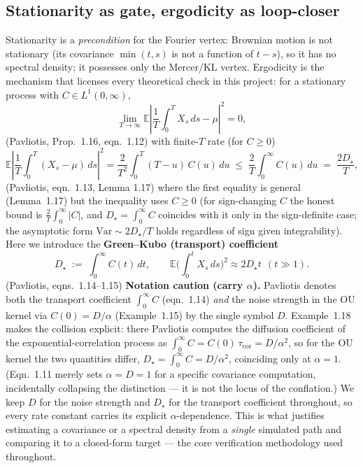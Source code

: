 \documentclass[11pt]{article}
\newcommand{\pav}[1]{{\small\color{hubblue}(Pavliotis, #1)}}
\newcommand{\Dstar}{D_{\star}}
\begin{document}
\subsection{Stationarity as gate, ergodicity as loop-closer}

Stationarity is a \emph{precondition} for the Fourier vertex: Brownian motion is not stationary (its
covariance $\min(t,s)$ is not a function of $t-s$), so it has no spectral density; it possesses only
the Mercer/KL vertex. Ergodicity is the mechanism that licenses every theoretical check in this
project: for a stationary process with $C\in L^1(0,\infty)$,
\begin{equation}
\lim_{T\to\infty}\mathbb{E}\left|\frac{1}{T}\int_0^T X_s\,ds - \mu\right|^2 = 0,
\label{eq:ergodic}
\end{equation}
\pav{Prop.~1.16, eqn.~1.12} with finite-$T$ rate (for $C\geq 0$)
\begin{equation}
\mathbb{E}\left|\frac{1}{T}\int_0^T (X_s-\mu)\,ds\right|^2 = \frac{2}{T^2}\int_0^T (T-u)\,C(u)\,du
\;\leq\; \frac{2}{T}\int_0^\infty C(u)\,du \;=\; \frac{2\Dstar}{T},
\label{eq:ergodic-rate}
\end{equation}
\pav{eqn.~1.13, Lemma 1.17} where the first equality is general (Lemma~1.17) but the inequality uses
$C\geq0$ (for sign-changing $C$ the honest bound is $\tfrac{2}{T}\int_0^\infty|C|$, and
$\Dstar=\int_0^\infty C$ coincides with it only in the sign-definite case; the asymptotic form
$\mathrm{Var}\sim 2\Dstar/T$ holds regardless of sign given integrability). Here we introduce the
\textbf{Green--Kubo (transport) coefficient}
\begin{equation}
\Dstar \;:=\; \int_0^\infty C(t)\,dt,
\qquad
\mathbb{E}\Big(\int_0^t X_s\,ds\Big)^2 \approx 2\Dstar t \ \ (t \gg 1).
\label{eq:greenkubo}
\end{equation}
\pav{eqns.~1.14--1.15} \textbf{Notation caution (carry $\alpha$).} Pavliotis denotes both the
transport coefficient $\int_0^\infty C$ (eqn.~1.14) \emph{and} the noise strength in the OU kernel via
$C(0)=D/\alpha$ (Example~1.15) by the single symbol $D$. Example~1.18 makes the collision explicit:
there Pavliotis computes the diffusion coefficient of the exponential-correlation process as
$\int_0^\infty C = C(0)\,\tau_{\mathrm{cor}} = D/\alpha^2$, so for the OU kernel the two quantities
differ, $\Dstar = \int_0^\infty C = D/\alpha^2$, coinciding only at $\alpha=1$. (Eqn.~1.11 merely
sets $\alpha=D=1$ for a specific covariance computation, incidentally collapsing the distinction ---
it is not the locus of the conflation.) We keep $D$ for the noise strength and $\Dstar$ for the
transport coefficient throughout, so every rate constant carries its explicit $\alpha$-dependence.
This is what justifies estimating a covariance or a spectral density from a \emph{single} simulated
path and comparing it to a closed-form target --- the core verification methodology used throughout.
\end{document}
